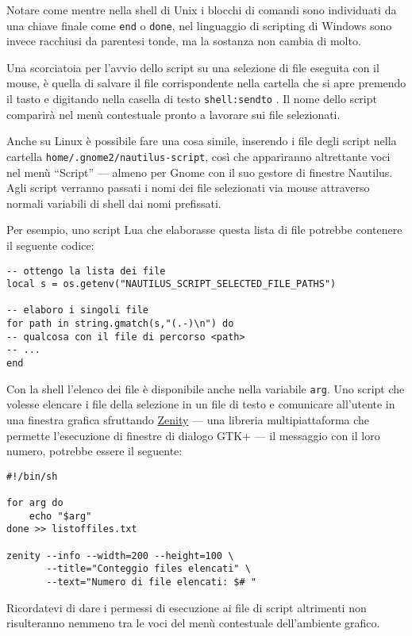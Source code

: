 Notare come mentre nella shell di Unix i blocchi di comandi sono individuati
da una chiave finale come \texttt{end} o \texttt{done}, nel linguaggio di
scripting di Windows sono invece racchiusi da parentesi tonde, ma la sostanza
non cambia di molto.

Una scorciatoia per l'avvio dello script su una selezione di file eseguita con
il mouse, è quella di salvare il file corrispondente nella cartella che si
apre premendo il tasto  e digitando nella casella di testo
\texttt{shell:sendto} \keys{\return}. Il nome dello script comparirà nel menù
contestuale pronto a lavorare sui file selezionati.

Anche su Linux è possibile fare una cosa simile, inserendo i file degli script
nella cartella \texttt{home/.gnome2/nautilus-script}, così che appariranno
altrettante voci nel menù ``Script'' --- almeno per Gnome con il suo gestore
di finestre Nautilus. Agli script verranno passati i nomi dei file selezionati
via mouse attraverso normali variabili di shell dai nomi prefissati.

Per esempio, uno script Lua che elaborasse questa lista di file potrebbe
contenere il seguente codice:
\begin{Verbatim}
-- ottengo la lista dei file
local s = os.getenv("NAUTILUS_SCRIPT_SELECTED_FILE_PATHS")

-- elaboro i singoli file
for path in string.gmatch(s,"(.-)\n") do
-- qualcosa con il file di percorso <path>
-- ...
end
\end{Verbatim}

Con la shell l'elenco dei file è disponibile anche nella variabile
\texttt{arg}. Uno script che volesse elencare i file della selezione in un
file di testo e comunicare all'utente in una finestra grafica sfruttando
\href{http://live.gnome.org/Zenity}{Zenity} ---  una libreria multipiattaforma
che permette l'esecuzione di finestre di dialogo GTK+ --- il messaggio con il
loro numero, potrebbe essere il seguente:
\begin{Verbatim}
#!/bin/sh

for arg do
    echo "$arg"
done >> listoffiles.txt

zenity --info --width=200 --height=100 \
       --title="Conteggio files elencati" \
       --text="Numero di file elencati: $# "
\end{Verbatim}

Ricordatevi di dare i permessi di esecuzione ai file di script altrimenti non
risulteranno nemmeno tra le voci del menù contestuale dell'ambiente grafico.



